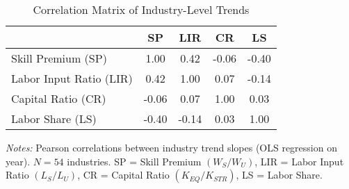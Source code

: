 \begin{table}[H]
\centering
\caption{Correlation Matrix of Industry-Level Trends}
\label{tab:correlations_matrix}
\small
\begin{tabular}{lcccc}
\toprule
 & SP & LIR & CR & LS \\
\midrule
Skill Premium (SP) & 1.00 & 0.42 & -0.06 & -0.40 \\
Labor Input Ratio (LIR) & 0.42 & 1.00 & 0.07 & -0.14 \\
Capital Ratio (CR) & -0.06 & 0.07 & 1.00 & 0.03 \\
Labor Share (LS) & -0.40 & -0.14 & 0.03 & 1.00 \\
\bottomrule
\end{tabular}
\begin{minipage}{\textwidth}
\vspace{0.2cm}
\footnotesize
\textit{Notes:} Pearson correlations between industry trend slopes (OLS regression on year). $N=54$ industries. SP = Skill Premium $(W_S/W_U)$, LIR = Labor Input Ratio $(L_S/L_U)$, CR = Capital Ratio $(K_{EQ}/K_{STR})$, LS = Labor Share.
\end{minipage}
\end{table}